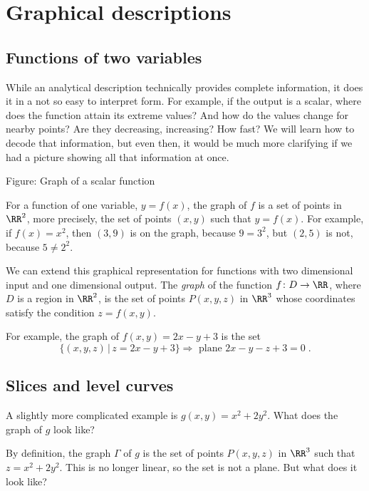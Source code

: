\section{Graphical descriptions}

\subsection{Functions of two variables}
While an analytical description technically provides
complete information, it does it in a not so easy to
interpret form. For example, if the output is a scalar,
where does the function attain its extreme values? And
how do the values change for nearby points? Are they
decreasing, increasing? How fast? We will learn how to
decode  that information, but even then, it would be much
more clarifying if we had a picture showing all that
information at once.

\vspace{1cm}
\begin{center}
  Figure: Graph of a scalar function
\end{center}
\vspace{1cm}

For a function of one variable, $y=f(x)$, the graph of
$f$ is a set of points in $\RR^2$, more precisely,
the set of points $(x,y)$ such that $y=f(x)$.
For example, if $f(x) = x^2$, then  $(3,9)$ is on the
graph, because $9=3^2$, but $(2,5)$ is not, because
$5 \neq 2^2$.

We can extend this graphical representation for
functions with two dimensional input and one dimensional
output. The \emph{graph} of the function
$f\colon D \to \RR$, where $D$ is a region in $\RR^2$,
is the set of points $P(x,y,z)$ in $\RR^3$ whose
coordinates satisfy the condition $z=f(x,y)$.

For example, the graph of $f(x,y) = 2x-y+3$ is the set
%
$$\{ (x,y,z) \, | \, z= 2x-y+3\} \Longrightarrow
\text{ plane } 2x-y-z+3=0 \; .$$


\subsection{Slices and level curves}
A slightly more complicated example is
$g(x,y) =x^2+2y^2$. What does the
graph of $g$ look like?

By definition, the graph $\Gamma$ of $g$ is the set of points
$P(x,y,z)$ in $\RR^3$ such that $z=x^2+2y^2$. This is
no longer linear, so the set is not a plane. But what
does it look like?

